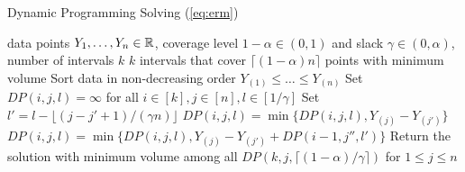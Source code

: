 \begin{algorithm}[tb]
\caption{Dynamic Programming Solving (\ref{eq:erm})}\label{alg:dp}
\begin{algorithmic}
 data points $Y_1, \dots, Y_n \in \mathbb{R}$, coverage level $1-\alpha \in (0,1)$ and slack $\gamma \in (0,\alpha)$, number of intervals $k$ 
 $k$ intervals that cover $\lceil (1-\alpha) n \rceil$ points with minimum volume
\STATE Sort data in non-decreasing order $Y_{(1)} \leq \dots \leq Y_{(n)}$\;
\STATE Set $DP(i,j,l) = \infty$ for all $i \in [k], j \in [n], l \in [1/\gamma]$\;
            \STATE Set $l' = l - \lfloor (j - j' + 1)/(\gamma n) \rfloor$\;
                \STATE $DP(i,j,l) = \min\{DP(i,j,l), Y_{(j)} - Y_{(j')}\}$\;
            \ENDIF
                \STATE $DP(i,j,l) = \min\{DP(i,j,l), Y_{(j)} - Y_{(j')} + DP(i-1, j'', l')\}$\;
            \ENDIF
        \ENDFOR
    \ENDFOR
\ENDFOR
\STATE Return the solution with minimum volume among all $DP(k,j, \lceil (1-\alpha)/\gamma \rceil )$ for $1 \leq j \leq n$\;
\end{algorithmic}
\end{algorithm}

